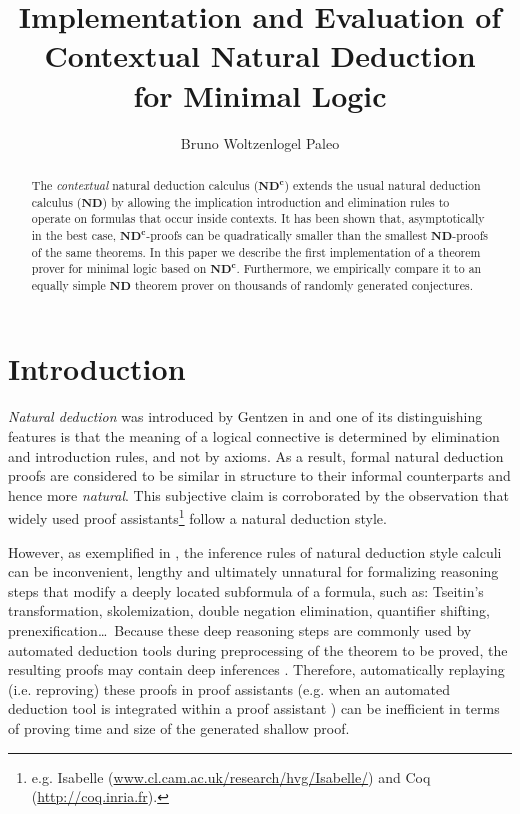 \documentclass{llncs}
\title{
  Implementation and Evaluation of \\ 
  Contextual Natural Deduction \\
  for Minimal Logic
}
\author{
  Bruno Woltzenlogel Paleo%
}
\institute{
  Vienna University of Technology \\
  Australian National University \\
  \email{bruno.wp@gmail.com}
}
\begin{document}
\maketitle

\newcommand{\ND}{$\textbf{ND}$\xspace}
\newcommand{\NDd}{$\textbf{ND}^\textbf{c}$\xspace}
\newcommand{\lc}{\lambda^c}

\begin{abstract}
The \emph{contextual} natural deduction calculus ({\NDd}) extends the usual natural deduction calculus ({\ND}) by allowing the implication introduction and elimination rules to operate on formulas that occur inside contexts. It has been shown that, asymptotically in the best case, {\NDd}-proofs can be quadratically smaller than the smallest {\ND}-proofs of the same theorems. In this paper we describe the first implementation of a theorem prover for minimal logic based on {\NDd}. Furthermore, we empirically compare it to an equally simple {\ND} theorem prover on thousands of randomly generated conjectures.
\end{abstract}


\section{Introduction}

\emph{Natural deduction} was introduced by Gentzen in \cite{Gentzen1934Untersuchungen-uber-das-logische-Schliesen} and one of its distinguishing features is that the meaning of a logical connective is determined by elimination and introduction rules, and not by axioms. As a result, formal natural deduction proofs are considered to be similar in structure to their informal counterparts and hence more \emph{natural}. This subjective claim is corroborated by the observation that widely used proof assistants\footnote{e.g. Isabelle {\scriptsize (\url{www.cl.cam.ac.uk/research/hvg/Isabelle/})} and Coq {\scriptsize (\url{http://coq.inria.fr})}.} 
follow a natural deduction style.

However, as exemplified in \cite{NDc}, the inference rules of natural deduction style calculi can be inconvenient, lengthy and ultimately unnatural for formalizing reasoning steps that modify a deeply located subformula of a formula, such as: Tseitin's transformation, skolemization, double negation elimination, quantifier shifting, prenexification\ldots  \ Because these deep reasoning steps are commonly used by automated deduction tools during preprocessing of the theorem to be proved, the resulting proofs may contain deep inferences \cite{DeharbeFontaineWoltzenlogel-Paleo2011Quantifier-Inference-Rules-in-the-Proof-Format-of-VeriT}. Therefore, automatically replaying (i.e. reproving) these proofs in proof assistants (e.g. when an automated deduction tool is integrated within a proof assistant \cite{BohmeNipkow2010Sledgehammer:-Judgement-Day}) can be inefficient in terms of proving time and size of the generated shallow proof.
\end{document}
